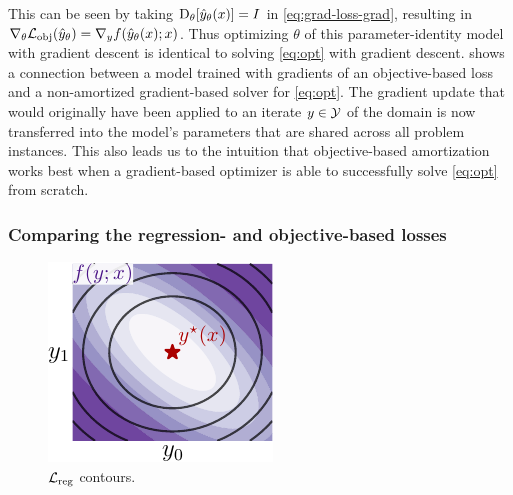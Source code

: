 \documentclass[twoside,11pt]{article}
\begin{document}
This can be seen by taking $\mathrm{D}_\theta[\hat y_\theta(x)]=I$
in \cref{eq:grad-loss-grad}, resulting in
$\nabla_\theta {\mathcal{L}}_{\rm obj}(\hat y_\theta)=\nabla_y f(\hat y_\theta(x); x)$.
Thus optimizing $\theta$ of this parameter-identity model with gradient descent
is identical to solving \cref{eq:opt} with gradient descent.
 shows a connection between a model trained with
gradients of an objective-based loss and a non-amortized gradient-based
solver for \cref{eq:opt}.
The gradient update that would originally have been applied to an
iterate $y\in{\mathcal{Y}}$ of the domain is now transferred into the
model's parameters that are shared across all problem instances.
This also leads us to the intuition that objective-based amortization
works best when a gradient-based optimizer is able to successfully
solve \cref{eq:opt} from scratch.

\subsubsection{Comparing the regression- and objective-based losses}
\begin{figure}
\vspace{-4mm}
\includegraphics[width=\linewidth]{fig/loss-comp.pdf}\vspace{-3mm}
\caption{${\mathcal{L}}_{\rm reg}$ contours.}
\vspace{-3mm}
\label{fig:reg-contours}
\end{figure}
\end{document}

